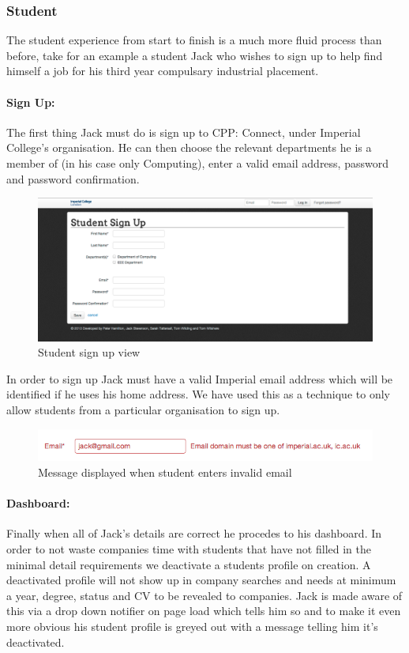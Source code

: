 \subsubsection{Student}
The student experience from start to finish is a much more fluid process than before, take for an example a student Jack who wishes to sign up to help find himself a job for his third year compulsary industrial placement.
  \paragraph{Sign Up:}
    The first thing Jack must do is sign up to CPP: Connect, under Imperial College's organisation. He can then choose the relevant departments he is a member of (in his case only Computing), enter a valid email address, password and password confirmation.

    \begin{figure}[H]\centering
    \includegraphics[scale=0.3]{images/user_experiences/student/sign_up_page}
    \caption{Student sign up view}
    \end{figure}

    In order to sign up Jack must have a valid Imperial email address which will be identified if he uses his home address. We have used this as a technique to only allow students from a particular organisation to sign up.

    \begin{figure}[H]\centering
    \includegraphics[scale=0.5]{images/user_experiences/student/invalid_email}
    \caption{Message displayed when student enters invalid email}
    \end{figure}

  \paragraph{Dashboard:}
    Finally when all of Jack's details are correct he procedes to his dashboard. In order to not waste companies time with students that have not filled in the minimal detail requirements we deactivate a students profile on creation. A deactivated profile will not show up in company searches and needs at minimum a year, degree, status and CV to be revealed to companies. 
    Jack is made aware of this via a drop down notifier on page load which tells him so and to make it even more obvious his student profile is greyed out with a message telling him it's deactivated.

